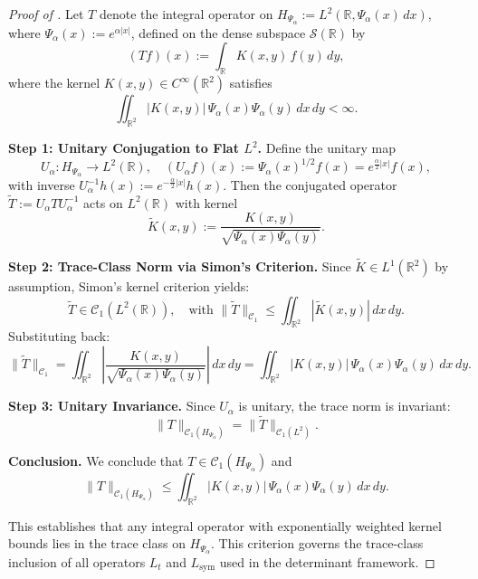 \begin{proof}[Proof of ]
Let \( T \) denote the integral operator on \( H_{\Psi_\alpha} := L^2(\mathbb{R}, \Psi_\alpha(x)\,dx) \), where \( \Psi_\alpha(x) := e^{\alpha |x|} \), defined on the dense subspace \( \mathcal{S}(\mathbb{R}) \) by
\[
(Tf)(x) := \int_{\mathbb{R}} K(x,y)\, f(y)\, dy,
\]
where the kernel \( K(x,y) \in C^\infty(\mathbb{R}^2) \) satisfies
\[
\iint_{\mathbb{R}^2} |K(x,y)|\, \Psi_\alpha(x)\Psi_\alpha(y)\, dx\,dy < \infty.
\]

\medskip
\noindent\textbf{Step 1: Unitary Conjugation to Flat \( L^2 \).}
Define the unitary map
\[
U_\alpha \colon H_{\Psi_\alpha} \to L^2(\mathbb{R}), \quad (U_\alpha f)(x) := \Psi_\alpha(x)^{1/2} f(x) = e^{\frac{\alpha}{2}|x|} f(x),
\]
with inverse \( U_\alpha^{-1} h(x) := e^{-\frac{\alpha}{2}|x|} h(x) \). Then the conjugated operator \( \widetilde{T} := U_\alpha T U_\alpha^{-1} \) acts on \( L^2(\mathbb{R}) \) with kernel
\[
\widetilde{K}(x,y) := \frac{K(x,y)}{\sqrt{\Psi_\alpha(x)\Psi_\alpha(y)}}.
\]

\medskip
\noindent\textbf{Step 2: Trace-Class Norm via Simon’s Criterion.}
Since \( \widetilde{K} \in L^1(\mathbb{R}^2) \) by assumption, Simon’s kernel criterion \cite[Thm.~4.2]{Simon2005TraceIdeals} yields:
\[
\widetilde{T} \in \mathcal{C}_1(L^2(\mathbb{R})), \quad \text{with } \|\widetilde{T}\|_{\mathcal{C}_1} \le \iint_{\mathbb{R}^2} |\widetilde{K}(x,y)|\, dx\,dy.
\]
Substituting back:
\[
\|\widetilde{T}\|_{\mathcal{C}_1} = \iint_{\mathbb{R}^2} \left| \frac{K(x,y)}{\sqrt{\Psi_\alpha(x)\Psi_\alpha(y)}} \right|\, dx\,dy = \iint_{\mathbb{R}^2} |K(x,y)|\, \Psi_\alpha(x)\Psi_\alpha(y)\, dx\,dy.
\]

\medskip
\noindent\textbf{Step 3: Unitary Invariance.}
Since \( U_\alpha \) is unitary, the trace norm is invariant:
\[
\|T\|_{\mathcal{C}_1(H_{\Psi_\alpha})} = \|\widetilde{T}\|_{\mathcal{C}_1(L^2)}.
\]

\medskip
\noindent\textbf{Conclusion.}
We conclude that \( T \in \mathcal{C}_1(H_{\Psi_\alpha}) \) and
\[
\|T\|_{\mathcal{C}_1(H_{\Psi_\alpha})} \le \iint_{\mathbb{R}^2} |K(x,y)|\, \Psi_\alpha(x)\Psi_\alpha(y)\, dx\,dy.
\]

This establishes that any integral operator with exponentially weighted kernel bounds lies in the trace class on \( H_{\Psi_\alpha} \). This criterion governs the trace-class inclusion of all operators \( L_t \) and \( L_{\mathrm{sym}} \) used in the determinant framework.
\end{proof}
